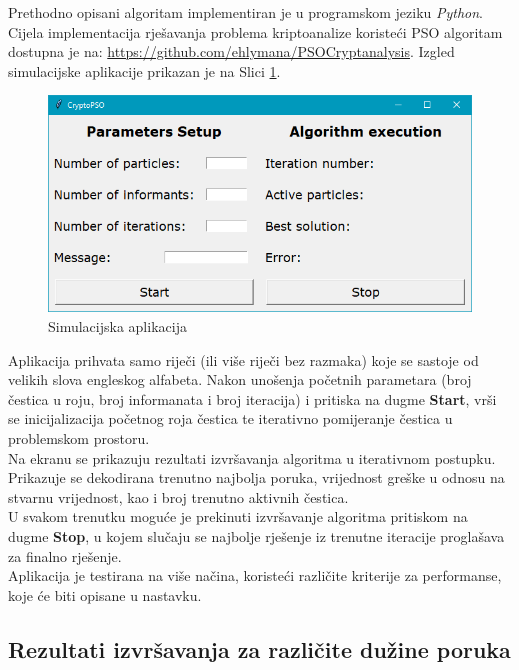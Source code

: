 \documentclass[12pt, a4paper]{article}
\begin{document}
Prethodno opisani algoritam implementiran je u programskom jeziku \textit{Python}. Cijela implementacija rješavanja problema kriptoanalize koristeći PSO algoritam dostupna je na: \href{https://github.com/ehlymana/PSOCryptanalysis}{https://github.com/ehlymana/PSOCryptanalysis}. Izgled simulacijske aplikacije prikazan je na Slici \ref{gui}.

\begin{figure}[H]

\center
\includegraphics[scale=0.7]{res/gui.png}
\caption{Simulacijska aplikacija}
\label{gui}

\end{figure}

Aplikacija prihvata samo riječi (ili više riječi bez razmaka) koje se sastoje od velikih slova engleskog alfabeta. Nakon unošenja početnih parametara (broj čestica u roju, broj informanata i broj iteracija) i pritiska na dugme \textbf{Start}, vrši se inicijalizacija početnog roja čestica te iterativno pomijeranje čestica u problemskom prostoru. \\

Na ekranu se prikazuju rezultati izvršavanja algoritma u iterativnom postupku. Prikazuje se dekodirana trenutno najbolja poruka, vrijednost greške u odnosu na stvarnu vrijednost, kao i broj trenutno aktivnih čestica. \\

U svakom trenutku moguće je prekinuti izvršavanje algoritma pritiskom na dugme \textbf{Stop}, u kojem slučaju se najbolje rješenje iz trenutne iteracije proglašava za finalno rješenje. \\

Aplikacija je testirana na više načina, koristeći različite kriterije za performanse, koje će biti opisane u nastavku.

\subsection{Rezultati izvršavanja za različite dužine poruka}
\end{document}
